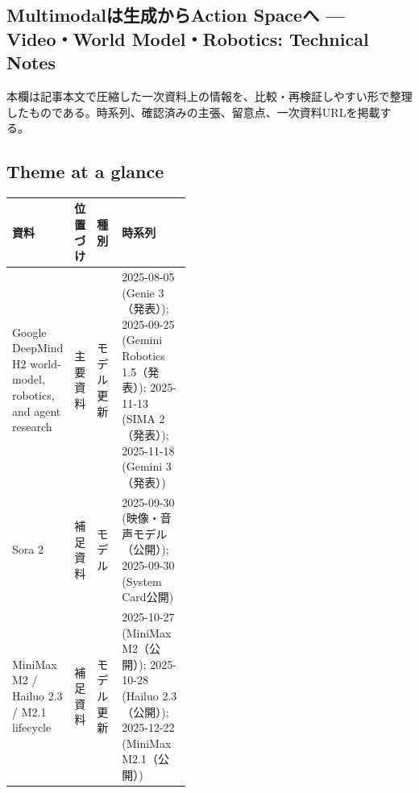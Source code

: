 \subsection*{Multimodalは生成からAction Spaceへ — Video・World Model・Robotics: Technical Notes}
本欄は記事本文で圧縮した一次資料上の情報を、比較・再検証しやすい形で整理したものである。時系列、確認済みの主張、留意点、一次資料URLを掲載する。
\medskip
\subsection*{Theme at a glance}
\begin{center}
\footnotesize
\begin{tabularx}{\linewidth}{@{}p{0.20\linewidth}p{0.10\linewidth}p{0.14\linewidth}X@{}}
\toprule
資料 & 位置づけ & 種別 & 時系列 \\
\midrule
Google DeepMind H2 world-model, robotics, and agent research & 主要資料 & モデル更新 & 2025-08-05 (Genie 3（発表）); 2025-09-25 (Gemini Robotics 1.5（発表）); 2025-11-13 (SIMA 2（発表）); 2025-11-18 (Gemini 3（発表）)      \\
Sora 2 & 補足資料 & モデル & 2025-09-30 (映像・音声モデル（公開）); 2025-09-30 (System Card公開)      \\
MiniMax M2 / Hailuo 2.3 / M2.1 lifecycle & 補足資料 & モデル更新 & 2025-10-27 (MiniMax M2（公開）); 2025-10-28 (Hailuo 2.3（公開）); 2025-12-22 (MiniMax M2.1（公開）)      \\
\bottomrule
\end{tabularx}
\end{center}
\normalsize

